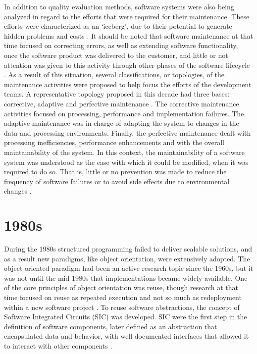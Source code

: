 \documentclass[10pt]{article}
\begin{document}
In addition to quality evaluation methods, software systems were also being analyzed in regard to the efforts that were required for their maintenance. These efforts were characterized as an ‘iceberg’, due to their potential to generate hidden problems and costs \cite{Canning72}. It should be noted that software maintenance at that time focused on correcting errors, as well as extending software functionality, once the software product was delivered to the customer, and little or not attention was given to this activity through other phases of the software lifecycle \cite{Canning72}. As a result of this situation, several classifications, or topologies, of the maintenance activities were proposed to help focus the efforts of the development teams. A representative topology proposed in this decade had three bases: corrective, adaptive and perfective maintenance \cite{Swanson76}. The corrective maintenance activities focused on processing, performance and implementation failures. The adaptive maintenance was in charge of adapting the system to changes in the data and processing environments. Finally, the perfective maintenance dealt with processing inefficiencies, performance enhancements and with the overall maintainability of the system. In this context, the maintainability of a software system was understood as the ease with which it could be modified, when it was required to do so. That is, little or no prevention was made to reduce the frequency of software failures or to avoid side effects due to environmental changes \cite{Swanson76}.


\section{1980s}

During the 1980s structured programming failed to deliver scalable solutions, and as a result new paradigms, like object orientation, were extensively adopted. The object oriented paradigm had been an active research topic since the 1960s, but it was not until the mid 1980s that implementations became widely available. One of the core principles of object orientation was reuse, though research at that time focused on reuse as repeated execution and not so much as redeployment within a new software project \cite{Barroca99}. To reuse software abstractions, the concept of Software Integrated Circuits (SIC) was developed. SIC were the first step in the definition of software components, later defined as an abstraction that encapsulated data and behavior, with well documented interfaces that allowed it to interact with other components \cite{Barroca99}.
\end{document}
